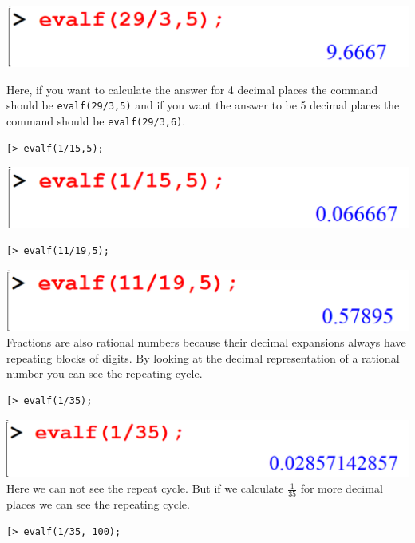 \documentclass[
]{book}
\theoremstyle{definition}
\theoremstyle{definition}
\theoremstyle{definition}
\theoremstyle{definition}
\theoremstyle{remark}
\begin{document}
\includegraphics{figures/Lesson 1/fig37.png}

Here, if you want to calculate the answer for 4 decimal places the command should be \texttt{evalf(29/3,5)} and if you want the answer to be 5 decimal places the command should be \texttt{evalf(29/3,6)}.

\begin{verbatim}
[> evalf(1/15,5);
\end{verbatim}

\includegraphics{figures/Lesson 1/fig38.png}

\begin{verbatim}
[> evalf(11/19,5);
\end{verbatim}

\includegraphics{figures/Lesson 1/fig39.png}
Fractions are also rational numbers because their decimal expansions always have repeating blocks of digits. By looking at the decimal representation of a rational number you can see the repeating cycle.

\begin{verbatim}
[> evalf(1/35);
\end{verbatim}

\includegraphics{figures/Lesson 1/fig40.png}
Here we can not see the repeat cycle. But if we calculate \(\frac{1}{35}\) for more decimal places we can see the repeating cycle.

\begin{verbatim}
[> evalf(1/35, 100);
\end{verbatim}
\end{document}
